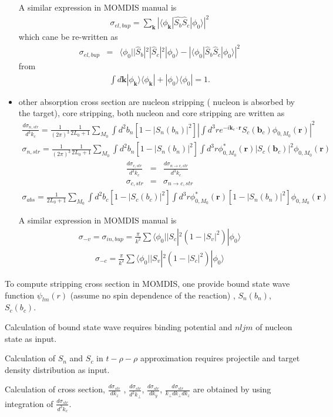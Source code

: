 \documentclass[11pt]{book}
\def\bm{\boldsymbol}
\def\vk{{\bm k}}
\def\vr{{\bm r}}
\def\la{\langle}
\def\ra{\rangle}
\newcommand{\bea}{\begin{eqnarray}}
\newcommand{\eea}{\end{eqnarray}}
\newcommand{\no}{\nonumber \\}
\begin{document}
\begin{itemize}
    A similar expression in MOMDIS manual is 
    \bea 
    \sigma_{el,bup}= \sum_{\vk}|\la \phi_{\vk}|\hat{S_{b}}\hat{S}_c|\phi_0\ra|^2
    \eea 
    which cane be re-written as
    \bea 
    \sigma_{el,bup}
    &=& \la \phi_0| |\hat{S}_b|^2|\hat{S}_c|^2|\phi_0\ra 
     -|\la \phi_0|\hat{S}_b\hat{S}_c|\phi_0\ra|^2
    \eea 
    from 
    \bea 
    \int d\vk |\phi_\vk\ra\la\phi_\vk|+|\phi_0\ra\la\phi_0|=1.
    \eea 
 \item other absorption cross section 
   are nucleon stripping ( nucleon is absorbed by the target),  core stripping, both nucleon and core stripping are written as
   \bea 
   \frac{d\sigma_{n,str}}{d^3 k_c}
   = \frac{1}{(2\pi)^3}\frac{1}{2L_0+1}
   \sum_{M_0}\int d^2 b_n [1-|S_n(b_n)|^2]
   | \int d^3 r e^{-i \vk_c\cdot \vr}
   S_c({\bm b}_c) \phi_{0,M_0}(\vr) |^2
   \eea 
   \bea 
   \sigma_{n,str} = \frac{1}{(2\pi)^3}\frac{1}{2L_0+1}
   \sum_{M_0}\int d^2 b_n [1-|S_n(b_n)|^2]
   \int d^3 r \phi^*_{0,M_0}(\vr)|S_c({\bm b}_c)|^2 \phi_{0,M_0}(\vr)
   \eea 
   \bea 
   \frac{d\sigma_{c,str}}{d^3 k_c}
   &=& \frac{d\sigma_{n\to c,str}}{d^3 k_c} \no 
   \sigma_{c,str} &=& \sigma_{n\to c,str}
   \eea 
   \bea 
   \sigma_{abs}=\frac{1}{2L_0+1}\sum_{M_0} 
    \int d^2 b_c [1-|S_c(b_c)|^2]
    \int d^3 r \phi_{0,M_0}^*(\vr)
    [1-|S_n(b_n)|^2]\phi_{0,M_0}(\vr)
   \eea 
   
   A similar expression in MOMDIS manual is 
   \bea 
   \sigma_{-v}=\sigma_{in,bup}=\frac{\pi}{k^2}\sum \la \phi_0|
    |S_c|^2(1-|S_v|^2)|\phi_0\ra 
   \eea 
   \bea 
   \sigma_{-c} = \frac{\pi}{k^2}\sum \la \phi_0|
   |S_v|^2(1-|S_c|^2)|\phi_0\ra 
   \eea 
\end{itemize} 

To compute stripping cross section in MOMDIS, 
one provide bound state wave function $\psi_{lm}(r)$
(assume no spin dependence of the reaction)
, $S_n(b_n)$, $S_c(b_c)$. 

Calculation of bound state wave requires binding potential and $nljm$ of nucleon state as input. 

Calculation of $S_n$ and $S_c$ in $t-\rho-\rho$ approximation requires projectile and target density
distribution as input. 

Calculation of cross section, $\frac{d\sigma_{str}}{dk_z}$ ,
$\frac{d\sigma_{str}}{d^2k_\perp}$,
$\frac{d\sigma_{str}}{dk_y}$,
$\frac{d\sigma_{str}}{k_\perp dk_\perp d k_z}$
are obtained by using integration of $\frac{d\sigma_{str}}{d^3 k_c}$.  




\end{document}
